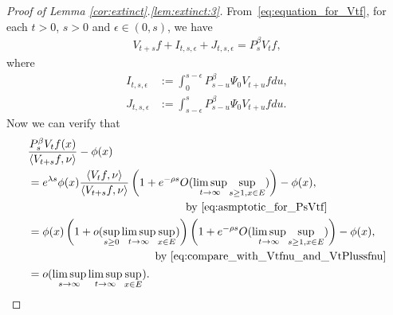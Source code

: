 \documentclass[12pt,a4paper]{amsart}
\numberwithin{equation}{section}
\theoremstyle{plain}
\theoremstyle{definition}
\begin{document}
\begin{proof}[Proof of Lemma \ref{cor:extinct}.\eqref{lem:extinct:3}]
From~\eqref{eq:equation_for_Vtf}, for each $t>0$, $s>0$ and $\epsilon \in (0,s)$, we have
\begin{align}
\label{eq:Vf_plus_I_plus_J_equals_PF}
  V_{t+s} f + I_{t,s,\epsilon} + J_{t,s,\epsilon}= P_s^\beta V_tf,
\end{align}
where
\begin{align}
I_{t,s,\epsilon}
&:= \int_0^{s-\epsilon} P_{s-u}^\beta \Psi_0 V_{t+u}f du,
\label{eq:definition_of_Its_epsilon}
\\ J_{t,s,\epsilon}
&:= \int_{s-\epsilon}^s P_{s-u}^\beta \Psi_0 V_{t+u}f du.
\label{eq:definition_of_Jtsepsilon}
\end{align}
Now we can verify that 
\begin{align}
  &\frac{ P_s^\beta V_tf(x)}{\left\langle V_{t+s} f,\nu \right\rangle } - \phi(x)
\\& \begin{multlined}= e^{\lambda s} \phi(x)\frac{  \left\langle V_tf,\nu \right\rangle   }{\left\langle V_{t+s}f,\nu \right\rangle } \left( 1+ e^{-\rho s} O(\limsup_{t\to \infty}\sup_{s\geq 1, x\in E}) \right)- \phi(x),
\\ \text{by~\eqref{eq:asmptotic_for_PsVtf}} \end{multlined}
  \\ &\begin{multlined} = \phi(x) \left( 1+o(\sup_{s \geq 0} \limsup_{t\to \infty} \sup_{x\in E}) \right)  \left( 1+ e^{-\rho s} O(\limsup_{t\to \infty}\sup_{s\geq 1, x\in E}) \right)- \phi(x),
\\ \text{by~\eqref{eq:compare_with_Vtfnu_and_VtPlussfnu}} \end{multlined}
\\&= o(\limsup_{s\to \infty}\limsup_{t\to \infty} \sup_{x\in E}). 
\label{eq:9}
\end{align}


\end{proof}
\end{document}
